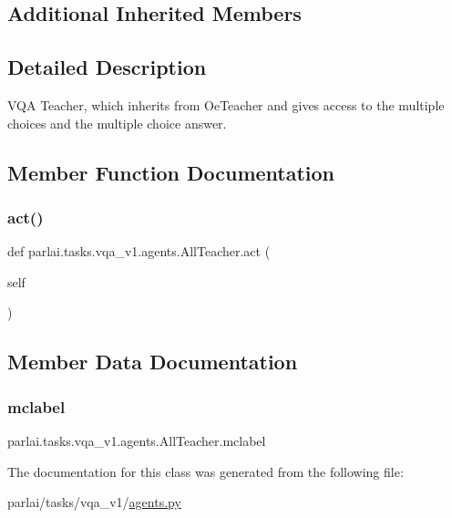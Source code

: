 \subsection*{Additional Inherited Members}


\subsection{Detailed Description}
\begin{DoxyVerb}VQA Teacher, which inherits from OeTeacher and gives access to the multiple choices
and the multiple choice answer.
\end{DoxyVerb}
 

\subsection{Member Function Documentation}
\mbox{\label{classparlai_1_1tasks_1_1vqa__v1_1_1agents_1_1AllTeacher_af1d9fbd6919aba788a5c76f3fbe59957}} 
\subsubsection{\texorpdfstring{act()}{act()}}
{\footnotesize\ttfamily def parlai.\+tasks.\+vqa\+\_\+v1.\+agents.\+All\+Teacher.\+act (\begin{DoxyParamCaption}\item[{}]{self }\end{DoxyParamCaption})}



\subsection{Member Data Documentation}
\mbox{\label{classparlai_1_1tasks_1_1vqa__v1_1_1agents_1_1AllTeacher_a195e6128ad37b6d0428866745c0490e3}} 
\subsubsection{\texorpdfstring{mclabel}{mclabel}}
{\footnotesize\ttfamily parlai.\+tasks.\+vqa\+\_\+v1.\+agents.\+All\+Teacher.\+mclabel}



The documentation for this class was generated from the following file\+:\begin{DoxyCompactItemize}
\item 
parlai/tasks/vqa\+\_\+v1/\hyperlink{parlai_2tasks_2vqa__v1_2agents_8py}{agents.\+py}\end{DoxyCompactItemize}
